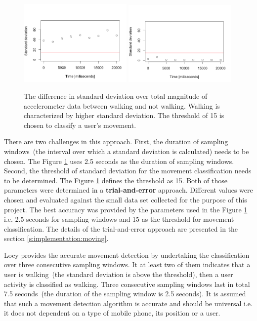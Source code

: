 \begin{figure}[H]
\centering
\includegraphics[width=0.49\textwidth, scale=0.6]{plots/stddev_walking}
\includegraphics[width=0.49\textwidth, scale=0.6]{plots/stddev_no_walking}
\caption{\label{p:moving:stddev} The difference in standard deviation over total magnitude of accelerometer data between walking and not walking. Walking is characterized by higher standard deviation. The threshold of 15 is chosen to classify a user's movement.}
\end{figure}

There are two challenges in this approach. First, the duration of sampling windows\ (the interval over which a standard deviation is calculated) needs to be chosen. The Figure \ref{p:moving:stddev} uses 2.5 seconds as the duration of sampling windows. Second, the threshold of standard deviation for the movement classification needs to be determined. The Figure \ref{p:moving:stddev} defines the threshold as 15. Both of those parameters were determined in a \textbf{trial-and-error} approach. Different values were chosen and evaluated against the small data set collected for the purpose of this project. The best accuracy was provided by the parameters used in the Figure \ref{p:moving:stddev} i.e. 2.5 seconds for sampling windows and 15 as the threshold for movement classification. The details of the trial-and-error approach are presented in the section \ref{s:implementation:moving}.

Locy provides the accurate movement detection by undertaking the classification over three consecutive sampling windows. It at least two of them indicates that a user is walking\ (the standard deviation is above the threshold), then a user activity is classified as walking. Three consecutive sampling windows last in total 7.5 seconds\ (the duration of the sampling window is 2.5 seconds). It is assumed that such a movement detection algorithm is accurate and should be universal i.e. it does not dependent on a type of mobile phone, its position or a user.

